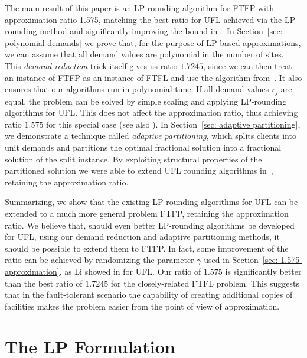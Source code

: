 \documentclass[11pt]{article}
\begin{document}
\smallskip

The main result of this paper is an LP-rounding algorithm for FTFP
with approximation ratio 1.575, matching the best ratio for UFL
achieved via the LP-rounding method \cite{ByrkaGS10} and significantly
improving the bound in~\cite{YanC11}. In Section~\ref{sec: polynomial
  demands} we prove that, for the purpose of LP-based approximations,
we can assume that all demand values are polynomial in the number of
sites. This \emph{demand reduction} trick itself gives us ratio
$1.7245$, since we can then treat an instance of FTFP as an instance
of FTFL and use the algorithm from~\cite{ByrkaSS10}. It also ensures
that our algorithms run in polynomial time. If all demand values $r_j$
are equal, the problem can be solved by simple scaling and applying
LP-rounding algorithms for UFL. This does not affect the approximation
ratio, thus achieving ratio $1.575$ for this special case (see also
\cite{LiaoShen11}). In Section~\ref{sec: adaptive partitioning}, we
demonstrate a technique called \emph{adaptive partitioning}, which
splits clients into unit demands and partitions the optimal fractional
solution into a fractional solution of the split instance. By
exploiting structural properties of the partitioned solution we were
able to extend UFL rounding algorithms
in~\cite{gupta08,ChudakS04,ByrkaGS10}, retaining the approximation
ratio.

Summarizing, we show that the existing LP-rounding
algorithms for UFL can be extended to a much more general
problem FTFP, retaining the approximation ratio. We believe
that, should even better LP-rounding algorithms be developed
for UFL, using our demand reduction and
adaptive partitioning methods, it should be possible to
extend them to FTFP.  In fact, some improvement of the ratio
can be achieved by randomizing the parameter
$\gamma$ used in Section~\ref{sec: 1.575-approximation}, as Li showed in \cite{Li11}
for UFL.  Our ratio of $1.575$ is significantly better
than the best ratio of $1.7245$ for the closely-related FTFL
problem. This suggests that in the fault-tolerant scenario
the capability of creating additional copies of facilities
makes the problem easier from the point of view of
approximation.


\section{The LP Formulation}\label{sec: the lp formulation}
\end{document}
